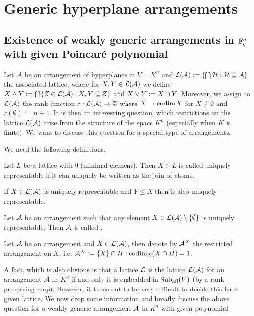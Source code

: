 \section{Generic hyperplane arrangements}

\subsection{Existence of weakly generic arrangements in $\mathbb{F}_{q}^n$ with given Poincaré polynomial}

Let $\mathcal{A}$ be an arrangement of hyperplanes in $V=K^n$ and $\mathcal{L}(\mathcal{A}):=\{\bigcap \mathcal{H}:\mathcal{H}\subseteq \mathcal{A}\}$ the associated lattice, where for $X,Y\in\mathcal{L}(\mathcal{A})$ we define $X\wedge Y:=\bigcap\{Z\in\mathcal{L}(\mathcal{A}):X,Y\subseteq Z\}$ and $X\vee Y:= X\cap Y$.
Moreover, we assign to $\mathcal{L}(\mathcal{A})$ the rank function $r:\mathcal{L}(\mathcal{A})\rightarrow \mathbb{Z}$ where $X\mapsto \mathop\mathrm{codim} X$ for $X\neq \emptyset$ and $r(\emptyset):=n+1$.
It is then an interesting question, which restrictions on the lattice $\mathcal{L}(\mathcal{A})$ arise from the structure of the space $K^n$ (especially when $K$ is finite). We want to discuss this question for a special type of arrangements.

We need the following definitions.

\begin{definition} 
    Let $L$ be a lattice with $0$ (minimal element). Then $X\in L$ is called uniquely representable if it can uniquely be written as the join of atoms.
\end{definition}

\begin{remark}
    If $X\in\mathcal{L}(\mathcal{A})$ is uniquely representable and $Y\leq X$ then is also uniquely representable. 
\end{remark}

\begin{definition}
    Let $\mathcal{A}$ be an arrangement such that any element $X\in\cL(\cA)\setminus\set{\emptyset}$ is uniquely representable. Then $\mathcal{A}$ is called .
\end{definition}

\begin{definition}
    Let $\mathcal{A}$ be an arrangement and $X\in\mathcal{L}(\mathcal{A})$, then denote by $\mathcal{A}^X$ the restricted arrangement on $X$, i.e. $\cA^X:=\set{X\setmeet H:\codim_X(X\setmeet H)=1}$.
\end{definition}

A fact, which is also obvious is that a lattice $\mathcal{L}$ is the lattice $\mathcal{L}(\mathcal{A})$ for an arrangement $\mathcal{A}$ in $K^n$ if and only it is embedded in $\mathop\mathrm{Sub}\nolimits_{\mathop\mathrm{aff}}(V)$ (by a rank preserving map). However, it turns out to be very difficult to decide this for a given lattice.
We now drop some information and breafly discuss the above question for a weakly generic arrangement $\mathcal{A}$ in $K^n$ with given  polynomial.


